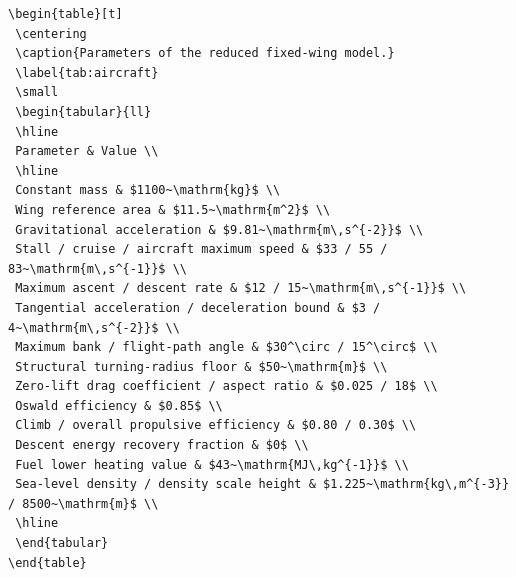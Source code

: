 \documentclass[12pt]{article}
\begin{document}
\begin{verbatim}
\begin{table}[t]
 \centering
 \caption{Parameters of the reduced fixed-wing model.}
 \label{tab:aircraft}
 \small
 \begin{tabular}{ll}
 \hline
 Parameter & Value \\
 \hline
 Constant mass & $1100~\mathrm{kg}$ \\
 Wing reference area & $11.5~\mathrm{m^2}$ \\
 Gravitational acceleration & $9.81~\mathrm{m\,s^{-2}}$ \\
 Stall / cruise / aircraft maximum speed & $33 / 55 / 83~\mathrm{m\,s^{-1}}$ \\
 Maximum ascent / descent rate & $12 / 15~\mathrm{m\,s^{-1}}$ \\
 Tangential acceleration / deceleration bound & $3 / 4~\mathrm{m\,s^{-2}}$ \\
 Maximum bank / flight-path angle & $30^\circ / 15^\circ$ \\
 Structural turning-radius floor & $50~\mathrm{m}$ \\
 Zero-lift drag coefficient / aspect ratio & $0.025 / 18$ \\
 Oswald efficiency & $0.85$ \\
 Climb / overall propulsive efficiency & $0.80 / 0.30$ \\
 Descent energy recovery fraction & $0$ \\
 Fuel lower heating value & $43~\mathrm{MJ\,kg^{-1}}$ \\
 Sea-level density / density scale height & $1.225~\mathrm{kg\,m^{-3}} / 8500~\mathrm{m}$ \\
 \hline
 \end{tabular}
\end{table}


\end{verbatim}
\end{document}
